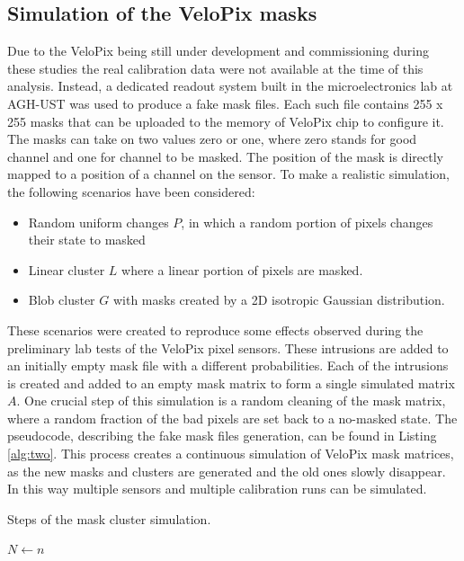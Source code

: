 \subsection{Simulation of the VeloPix masks}

Due to the VeloPix being still under development and commissioning during these studies the real calibration data  were not available at the time of this analysis. Instead, a dedicated readout system built in the microelectronics lab at AGH-UST was used to produce a fake mask files. Each such file contains 255 x 255 masks that can be uploaded to the memory of VeloPix chip to configure it. The masks can take on two values zero or one, where zero stands for good channel and one for channel to be masked. The position of the mask is directly mapped to a position of a channel on the sensor.
To make a realistic simulation, the following scenarios have been considered:

\begin{itemize}[noitemsep]
  \item Random uniform changes $P$, in which a random portion of pixels changes their state to masked
  \item Linear cluster $L$ where a linear portion of pixels are masked.
  \item Blob cluster $G$ with masks created by a 2D isotropic Gaussian distribution.
\end{itemize}

These scenarios were created to reproduce some effects observed during the preliminary lab tests of the VeloPix pixel sensors.
These intrusions are added to an initially empty mask file with a different probabilities. Each of the intrusions is created and added to an empty mask matrix to form a single simulated matrix $A$.
One crucial step of this simulation is a random cleaning of the mask matrix, where a random fraction 
of the bad pixels are set back to a no-masked state.
The pseudocode, describing the fake mask files generation, can be found in Listing \ref{alg:two}.
This process creates a continuous simulation of VeloPix mask matrices, as the new masks and clusters are generated and the old ones slowly disappear. In this way multiple sensors and multiple calibration runs can be simulated.

\begin{center}
\begin{algorithm}[H]
\caption{Steps of the mask cluster simulation.}\label{alg:two}
$N \gets n$\;
\end{algorithm}
\end{center}
